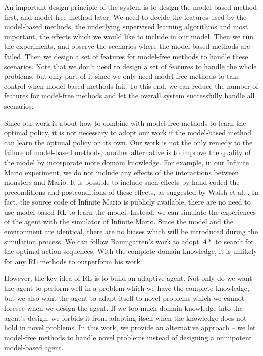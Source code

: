 An important design principle of the system is to design the model-based method first,
and model-free method later. 
We need to decide the features used by the
model-based methods, the underlying supervised learning algorithms and most
important, the effects which we would like to include in our model. Then we
run the experiments, and observe the scenarios where the model-based methods
are failed. 
Then we design a set of features for model-free methods to handle
these scenarios. Note that we don't need to design a set of features to handle
the whole problems, but only part of it since we only need model-free methods
to take control when model-based methods fail. To this end, we can reduce the
number of features for model-free methods and let the overall system
successfully handle all scenarios.

Since our work is about how to combine with model-free methods to learn the optimal policy,
it is not necessary to adopt our work if the model-based method can learn the optimal policy
on its own.
Our work is not the only remedy to the failure of model-based methods,
another alternative is to improve the quality of the model by incorporate more domain knowledge.
For example, in our Infinite Mario experiment, we do not include any effects 
of the interactions between monsters and Mario. It is possible to include such effects
by hand-coded the preconditions and postconditions of these effects, as suggested by Walsh et al. \cite{Walsh09}.
In fact, the source code of Infinite Mario is publicly available,
there are no need to use model-based RL to learn the model. Instead,
we can simulate the experiences of the agent with the simulator of Infinite Mario. 
Since the model and the environment are identical, there are no biases which will be 
introduced during the simulation process.
We can follow Baumgarten's work \cite{Robin09} to adopt $A*$ to search for the optimal action sequences.
With the complete domain knowledge, it is unlikely for any RL methods to outperform his work.

However, the key idea of RL is to build an adaptive agent.
Not only do we want the agent to perform well in a problem which we have the complete knowledge,
but we also want the agent to adapt itself to novel problems which we cannot foresee when we design the agent.
If we too much domain knowledge into the agent's design, we forbids it from adapting 
itself when the knowledge does not hold in novel problems. 
In this work, we provide an alternative approach -- we let model-free methods to 
handle novel problems instead of designing a omnipotent model-based agent.

